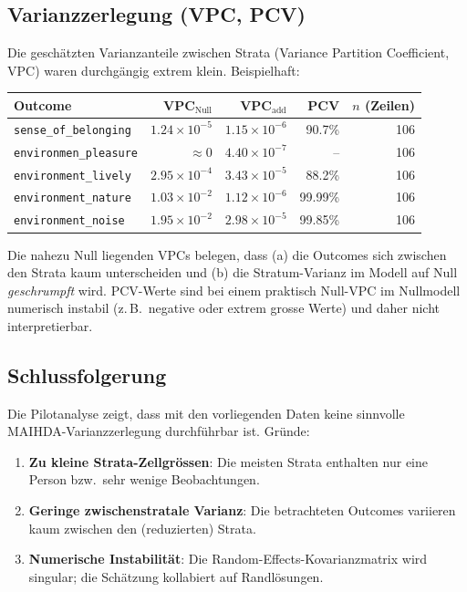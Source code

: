 \subsection{Varianzzerlegung (VPC, PCV)}
Die geschätzten Varianzanteile zwischen Strata (Variance Partition Coefficient, VPC) waren durchgängig extrem klein. Beispielhaft:

\begin{center}
\begin{tabular}{lrrrr}
\toprule
Outcome & VPC$_{\text{Null}}$ & VPC$_{\text{add}}$ & PCV & $n$ (Zeilen) \\
\midrule
\texttt{sense\_of\_belonging}      & $1.24\times 10^{-5}$ & $1.15\times 10^{-6}$ & 90.7\% & 106 \\
\texttt{environmen\_pleasure}      & $\approx 0$          & $4.40\times 10^{-7}$ & --      & 106 \\
\texttt{environment\_lively}       & $2.95\times 10^{-4}$ & $3.43\times 10^{-5}$ & 88.2\%  & 106 \\
\texttt{environment\_nature}       & $1.03\times 10^{-2}$ & $1.12\times 10^{-6}$ & 99.99\% & 106 \\
\texttt{environment\_noise}        & $1.95\times 10^{-2}$ & $2.98\times 10^{-5}$ & 99.85\% & 106 \\
\bottomrule
\end{tabular}
\end{center}

Die nahezu Null liegenden VPCs belegen, dass (a) die Outcomes sich zwischen den Strata kaum unterscheiden und (b) die Stratum-Varianz im Modell auf Null \emph{geschrumpft} wird. PCV-Werte sind bei einem praktisch Null-VPC im Nullmodell numerisch instabil (z.\,B.\ negative oder extrem grosse Werte) und daher nicht interpretierbar.

\subsection{Schlussfolgerung}
Die Pilotanalyse zeigt, dass mit den vorliegenden Daten keine sinnvolle MAIHDA-Varianzzerlegung durchführbar ist. Gründe:
\begin{enumerate}
    \item \textbf{Zu kleine Strata-Zellgrössen}: Die meisten Strata enthalten nur eine Person bzw.\ sehr wenige Beobachtungen.
    \item \textbf{Geringe zwischenstratale Varianz}: Die betrachteten Outcomes variieren kaum zwischen den (reduzierten) Strata.
    \item \textbf{Numerische Instabilität}: Die Random-Effects-Kovarianzmatrix wird singular; die Schätzung kollabiert auf Randlösungen.
\end{enumerate}

